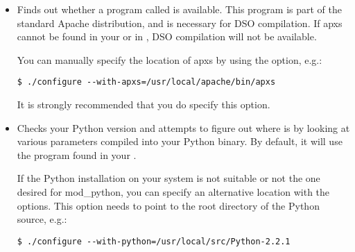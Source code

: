\begin{itemize}

\item
{}
Finds out whether a program called  is available. This
program is part of the standard Apache distribution, and is necessary
for DSO compilation. If apxs cannot be found in your  or in
, DSO compilation will not be available.

You can manually specify the location of apxs by using the
 option, e.g.:

\begin{verbatim}
$ ./configure --with-apxs=/usr/local/apache/bin/apxs 	
\end{verbatim}

It is strongly recommended that you do specify this option.



\item
{}
Checks your Python version and attempts to figure out where
 is by looking at various parameters compiled into
your Python binary. By default, it will use the 
program found in your .

 If the Python
installation on your system is not suitable or not the one desired for
mod_python, you can specify an alternative location with the
 options. This option needs to point to
the root directory of the Python source, e.g.:

\begin{verbatim}
$ ./configure --with-python=/usr/local/src/Python-2.2.1
\end{verbatim}                      


\end{itemize}
